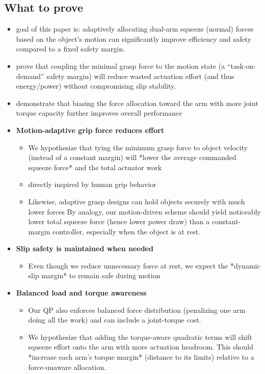 \documentclass[conference]{IEEEtran}
\begin{document}
\subsection{What to prove}
\begin{itemize}
    \item goal of this paper is: adaptively allocating dual-arm squeeze (normal) forces based on the object’s motion can significantly improve efficiency and safety compared to a fixed safety margin.
    \item prove that coupling the minimal grasp force to the motion state (a “task-on-demand” safety margin) will reduce wasted actuation effort (and thus energy/power) without compromising slip stability.
    \item demonstrate that biasing the force allocation toward the arm with more joint torque capacity further improves overall performance
    \item \textbf{Motion-adaptive grip force reduces effort}
    \begin{itemize}
        \item  We hypothesize that tying the minimum grasp force to object velocity (instead of a constant margin) will *lower the average commanded squeeze force* and the total actuator work
        \item directly inspired by human grip behavior
        \item Likewise, adaptive grasp designs can hold objects securely with much lower forces By analogy, our motion-driven scheme should yield noticeably lower total squeeze force (hence lower power draw) than a constant-margin controller, especially when the object is at rest. 
    \end{itemize}
    \item \textbf{Slip safety is maintained when needed}
        \begin{itemize}
            \item Even though we reduce unnecessary force at rest, we expect the *dynamic slip margin* to remain safe during motion
        \end{itemize}

    \item \textbf{Balanced load and torque awareness}
        \begin{itemize}
            \item Our QP also enforces balanced force distribution (penalizing one arm doing all the work) and can include a joint-torque cost.
            \item We hypothesize that adding the torque-aware quadratic terms will shift squeeze effort onto the arm with more actuation headroom.
            This should *increase each arm’s torque margin* (distance to its limits) relative to a force-unaware allocation.
        \end{itemize}
\end{itemize}
\end{document}
